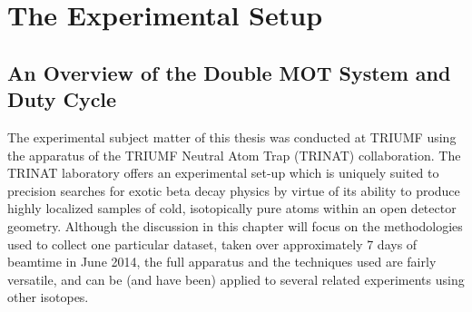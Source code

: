 %
%
%
\clearpage
\chapter{The Experimental Setup}
\label{experimental_chapter}
\section{An Overview of the Double MOT System and Duty Cycle}
\label{section:overview}
\label{setup_chapter}
%


The experimental subject matter of this thesis was conducted at TRIUMF using the apparatus of the TRIUMF Neutral Atom Trap (TRINAT) collaboration.  The TRINAT laboratory offers an experimental set-up which is uniquely suited to precision searches for exotic beta decay physics by virtue of its ability to produce highly localized samples of cold, isotopically pure atoms within an open detector geometry.    Although the discussion in this chapter will focus on the methodologies used to collect one particular dataset, taken over approximately 7 days of beamtime in June 2014, the full apparatus and the techniques used are fairly versatile, and can be (and have been) applied to
several related experiments using other isotopes.

